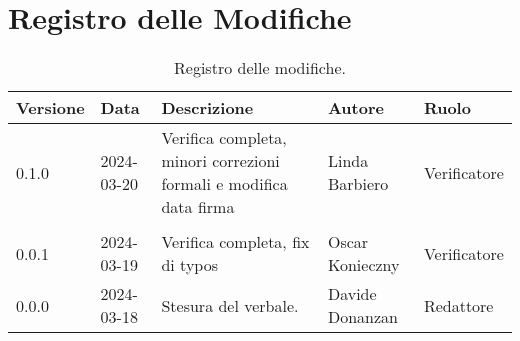 \section*{Registro delle Modifiche}
\begin{table}[ht!]	
		\centering
		\begin{tabular}{p{1.2cm} p{2cm} p{6cm} p{3cm} p{2cm}}
			\toprule
			\textbf{Versione}& \textbf{Data} & \textbf{Descrizione} & \textbf{Autore} & \textbf{Ruolo} \\
			\midrule
			0.1.0 & 2024-03-20 & Verifica completa, minori correzioni formali e modifica data firma & Linda Barbiero & Verificatore \\\\
			0.0.1 & 2024-03-19 & Verifica completa, fix di typos & Oscar Konieczny &
			Verificatore \\ %
			0.0.0 & 2024-03-18 & Stesura del verbale.  & Davide Donanzan &
			Redattore \\ %
			\bottomrule
		\end{tabular}
		\caption{Registro delle modifiche.}
		\label{table:Registro delle modifiche.}
\end{table}